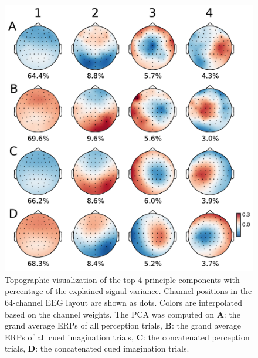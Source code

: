 \begin{figure}[t] 
  \begin{center}
    \includegraphics[scale=0.5]{Figures/principle_components.pdf}
    \caption{%
Topographic visualization of the top 4 principle components with percentage of the explained signal variance.
Channel positions in the 64-channel EEG layout are shown as dots.
Colors are interpolated based on the channel weights.
The PCA was computed on
\textbf{A}: the grand average \acp{ERP} of all perception trials,
\textbf{B}: the grand average \acp{ERP} of all cued imagination trials,
\textbf{C}: the concatenated perception trials,
\textbf{D}: the concatenated cued imagination trials.
}
    \label{fig:components}
  \end{center}
\end{figure}

